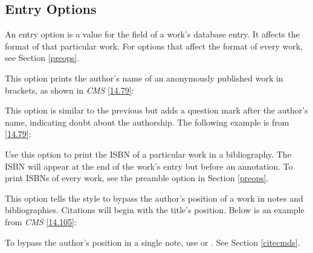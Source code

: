 \documentclass[11pt,letterpaper,oneside]{article}
\begin{document}
\subsection{Entry Options}
\label{entryops}

An entry option is a value for the  field of a
work's database entry. It affects the format of that particular work.
For options that affect the format of every work, see Section
\ref{preops}.

\begin{optionlist}


\noindent This option prints the author's name of an anonymously
published work in brackets, as shown in \textit{CMS} \ref{14.79}:

\begin{citebib}
\item \cite{horsley1796}
\end{citebib}


\noindent This option is similar to the previous but adds a question
mark after the author's name, indicating doubt about the authorship.
The following example is from \ref{14.79}:

\begin{citebib}
\item \cite{hawkes1834}
\end{citebib}


\noindent Use this option to print the ISBN of a particular work in a
bibliography. The ISBN will appear at the end of the work's entry but
before an annotation. To print ISBNs of every work, see the
 preamble option in Section \ref{preops}.


\noindent This option tells the style to bypass the author's position
of a work in notes and bibliographies. Citations will begin with the
title's position. Below is an example from \textit{CMS} \ref{14.105}:

\begin{citebib}
\item \cite{chaucer1966}
\end{citebib}

\noindent To bypass the author's position in a single note, use
 or . See Section \ref{citecmds}.


\end{optionlist}
\end{document}
